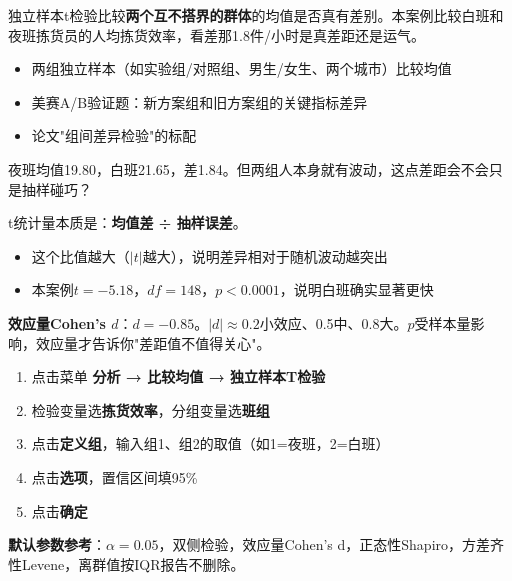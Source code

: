 
\begin{algointro}
独立样本t检验比较\textbf{两个互不搭界的群体}的均值是否真有差别。本案例比较白班和夜班拣货员的人均拣货效率，看差那1.8件/小时是真差距还是运气。
\end{algointro}

\begin{algoscene}
\begin{itemize}
    \item 两组独立样本（如实验组/对照组、男生/女生、两个城市）比较均值
    \item 美赛A/B验证题：新方案组和旧方案组的关键指标差异
    \item 论文"组间差异检验"的标配
\end{itemize}
\end{algoscene}

\begin{algoprinciple}
夜班均值19.80，白班21.65，差1.84。但两组人本身就有波动，这点差距会不会只是抽样碰巧？

t统计量本质是：\textbf{均值差 ÷ 抽样误差}。
\begin{itemize}
    \item 这个比值越大（$|t|$越大），说明差异相对于随机波动越突出
    \item 本案例$t=-5.18$，$df=148$，$p<0.0001$，说明白班确实显著更快
\end{itemize}

\textbf{效应量Cohen's $d$}：$d=-0.85$。$|d|\approx 0.2$小效应、0.5中、0.8大。$p$受样本量影响，效应量才告诉你"差距值不值得关心"。
\end{algoprinciple}

\begin{algosposs}
\begin{enumerate}
    \item 点击菜单 \textbf{分析 → 比较均值 → 独立样本T检验}
    \item 检验变量选\textbf{拣货效率}，分组变量选\textbf{班组}
    \item 点击\textbf{定义组}，输入组1、组2的取值（如1=夜班，2=白班）
    \item 点击\textbf{选项}，置信区间填95\%
    \item 点击\textbf{确定}
\end{enumerate}

\textbf{默认参数参考}：$\alpha=0.05$，双侧检验，效应量Cohen's d，正态性Shapiro，方差齐性Levene，离群值按IQR报告不删除。
\end{algosposs}

